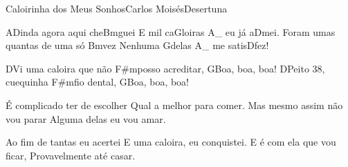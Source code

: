 \begin{musica}{Caloirinha dos Meus Sonhos}{Carlos Moisés}{Desertuna}

A\ac{D}{in}da agora aqui che\ac{Bm}{guei}
E mil ca\ac{G}{loi}ras \ac{A}{}_ eu já a\ac{D}{mei}.
Foram umas quantas de uma só \ac{Bm}{vez}
Nenhuma \ac{G}{de}las \ac{A}{}_ me satis\ac{D}{fez}!

\ac{D}{Vi} uma caloira que não \ac{F#m}{po}sso acreditar,
\ac{G}{Boa}, boa, boa!
\ac{D}{Pei}to 38, cuequinha \ac{F#m}{fio} dental,
\ac{G}{Boa}, boa, boa!

É complicado ter de escolher
Qual a melhor para comer.
Mas mesmo assim não vou parar
Alguma delas eu vou amar.


Ao fim de tantas eu acertei
E uma caloira, eu conquistei.
E é com ela que vou ficar,
Provavelmente até casar.


\end{musica}
